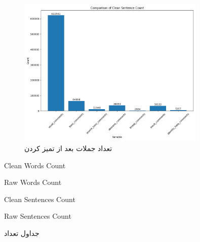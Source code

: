 \begin{figure}
  \centering
  \includegraphics[width=0.8\textwidth]{stats/clean_sentence_count.png}
  \caption{تعداد جملات بعد از تمیز کردن}
  \label{fig:clean_word_count}
\end{figure}

\clearpage

\begin{table}
  \centering
  \begin{subtable}{0.4\textwidth}
    \centering
    \begin{latin}
    \caption{Clean Words Count}
    \label{subfig:file1}
    \end{latin}
  \end{subtable}
  \hspace{2cm}
  \begin{subtable}{0.4\textwidth}
    \centering
    \begin{latin}
    \caption{Raw Words Count}
    \label{subfig:file2}
    \end{latin}
  \end{subtable}
  
  \vspace{0.5cm} %
  
  \begin{subtable}{0.4\textwidth}
    \centering
    \begin{latin}
    \caption{Clean Sentences Count}
    \label{subfig:file3}
    \end{latin}
  \end{subtable}
  \hfill
  \begin{subtable}{0.4\textwidth}
    \centering
    \begin{latin}
    \caption{Raw Sentences Count}
    \label{subfig:file4}
    \end{latin}
  \end{subtable}
  
  \caption{جداول تعداد}
  \label{fig:csv_files}
\end{table}

